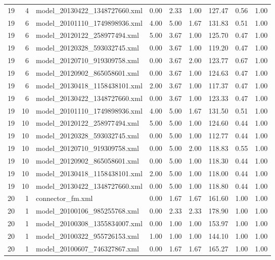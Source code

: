\begin{table}[ht]
\begin{tabular}{rrlrrrrrr}
   19 &   4 & model\_20130422\_1348727660.xml & 0.00 & 2.33 & 1.00 & 127.47 & 0.56 & 1.00 \\ 
   19 &   6 & model\_20101110\_1749898936.xml & 4.00 & 5.00 & 1.67 & 131.83 & 0.51 & 1.00 \\ 
   19 &   6 & model\_20120122\_258977494.xml & 5.00 & 3.67 & 1.00 & 125.70 & 0.47 & 1.00 \\ 
   19 &   6 & model\_20120328\_593032745.xml & 0.00 & 3.67 & 1.00 & 119.20 & 0.47 & 1.00 \\ 
   19 &   6 & model\_20120710\_919309758.xml & 0.00 & 3.67 & 2.00 & 123.77 & 0.67 & 1.00 \\ 
   19 &   6 & model\_20120902\_865058601.xml & 0.00 & 3.67 & 1.00 & 124.63 & 0.47 & 1.00 \\ 
   19 &   6 & model\_20130418\_1158438101.xml & 2.00 & 3.67 & 1.00 & 117.37 & 0.47 & 1.00 \\ 
   19 &   6 & model\_20130422\_1348727660.xml & 0.00 & 3.67 & 1.00 & 123.33 & 0.47 & 1.00 \\ 
   19 &  10 & model\_20101110\_1749898936.xml & 4.00 & 5.00 & 1.67 & 131.50 & 0.51 & 1.00 \\ 
   19 &  10 & model\_20120122\_258977494.xml & 5.00 & 5.00 & 1.00 & 124.60 & 0.44 & 1.00 \\ 
   19 &  10 & model\_20120328\_593032745.xml & 0.00 & 5.00 & 1.00 & 112.77 & 0.44 & 1.00 \\ 
   19 &  10 & model\_20120710\_919309758.xml & 0.00 & 5.00 & 2.00 & 118.83 & 0.55 & 1.00 \\ 
   19 &  10 & model\_20120902\_865058601.xml & 0.00 & 5.00 & 1.00 & 118.30 & 0.44 & 1.00 \\ 
   19 &  10 & model\_20130418\_1158438101.xml & 2.00 & 5.00 & 1.00 & 118.00 & 0.44 & 1.00 \\ 
   19 &  10 & model\_20130422\_1348727660.xml & 0.00 & 5.00 & 1.00 & 118.80 & 0.44 & 1.00 \\ 
   20 &   1 & connector\_fm.xml & 0.00 & 1.67 & 1.67 & 161.60 & 1.00 & 1.00 \\ 
   20 &   1 & model\_20100106\_985255768.xml & 0.00 & 2.33 & 2.33 & 178.90 & 1.00 & 1.00 \\ 
   20 &   1 & model\_20100308\_1355834007.xml & 0.00 & 1.00 & 1.00 & 153.97 & 1.00 & 1.00 \\ 
   20 &   1 & model\_20100322\_955726153.xml & 1.00 & 1.00 & 1.00 & 144.10 & 1.00 & 1.00 \\ 
   20 &   1 & model\_20100607\_746327867.xml & 0.00 & 1.67 & 1.67 & 165.27 & 1.00 & 1.00 \\ 

\end{tabular}
\end{table}
